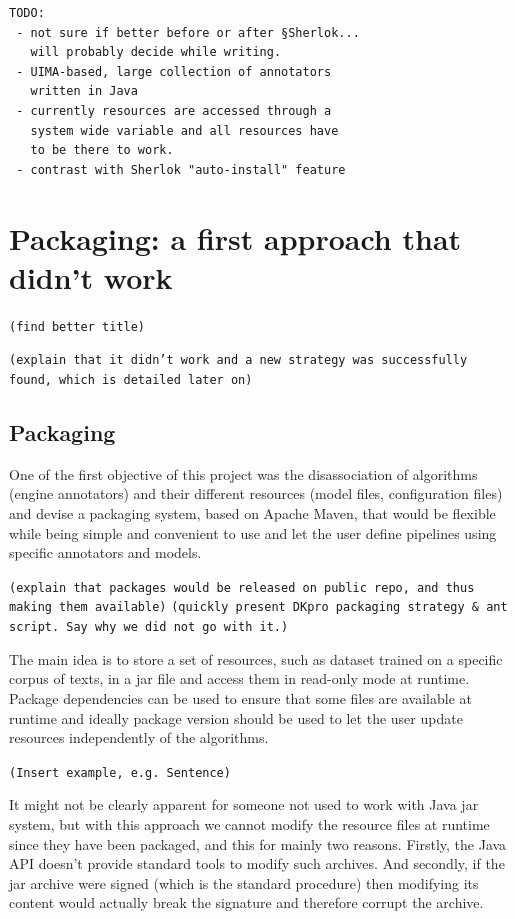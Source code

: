 \documentclass{article}
\newcommand{\TODO}[1]{\texttt{\textcolor{YellowOrange}{(#1)}}} %
\begin{document}
\begin{verbatim}
TODO:
 - not sure if better before or after §Sherlok...
   will probably decide while writing.
 - UIMA-based, large collection of annotators
   written in Java
 - currently resources are accessed through a
   system wide variable and all resources have
   to be there to work.
 - contrast with Sherlok "auto-install" feature
\end{verbatim}

\section{Packaging: a first approach that didn't work}

\TODO{find better title}

\TODO{explain that it didn't work and a new strategy was successfully found, which is detailed later on}

\subsection{Packaging}

One of the first objective of this project was the disassociation of algorithms (engine annotators) and their different resources (model files, configuration files) and devise a packaging system, based on Apache Maven, that would be flexible while being simple and convenient to use and let the user define pipelines using specific annotators and models.

\TODO{explain that packages would be released on public repo, and thus making them available}
\TODO{quickly present DKpro packaging strategy \& ant script. Say why we did not go with it.}

The main idea is to store a set of resources, such as dataset trained on a specific corpus of texts, in a jar file and access them in read-only mode at runtime. Package dependencies can be used to ensure that some files are available at runtime and ideally package version should be used to let the user update resources independently of the algorithms.

\TODO{Insert example, e.g. Sentence}

It might not be clearly apparent for someone not used to work with Java jar system, but with this approach we cannot modify the resource files at runtime since they have been packaged, and this for mainly two reasons. Firstly, the Java API doesn't provide standard tools to modify such archives. And secondly, if the jar archive were signed (which is the standard procedure) then modifying its content would actually break the signature and therefore corrupt the archive.
\end{document}
